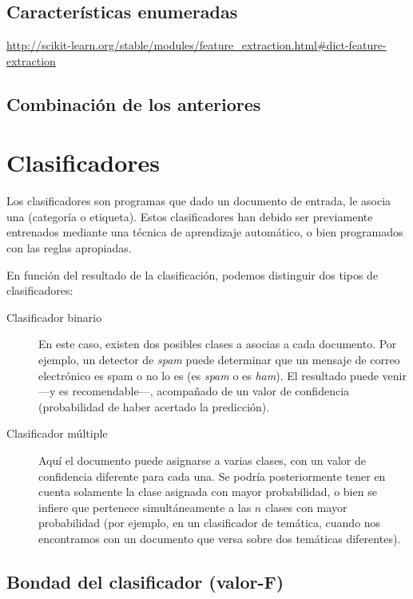 \citep{Socher2013}

\subsection{Características enumeradas}

\url{http://scikit-learn.org/stable/modules/feature_extraction.html#dict-feature-extraction}

\subsection{Combinación de los anteriores}


\section{Clasificadores}

Los clasificadores son programas que dado un documento de entrada, le asocia una  (categoría o etiqueta). Estos clasificadores han debido ser previamente entrenados mediante una técnica de aprendizaje automático, o bien programados con las reglas apropiadas.

En función del resultado de la clasificación, podemos distinguir dos tipos de clasificadores:
\nopagebreak
\begin{description}
\item[Clasificador binario] En este caso, existen dos posibles clases a asocias a cada documento. Por ejemplo, un detector de \emph{spam} puede determinar que un mensaje de correo electrónico es spam o no lo es (es \emph{spam} o es \emph{ham}). El resultado puede venir ---y es recomendable---, acompañado de un valor de confidencia (probabilidad de haber acertado la predicción).
\item[Clasificador múltiple] Aquí el documento puede asignarse a varias clases, con un valor de confidencia diferente para cada una. Se podría posteriormente tener en cuenta solamente la clase asignada con mayor probabilidad, o bien se infiere que pertenece simultáneamente a las $n$ clases con mayor probabilidad (por ejemplo, en un clasificador de temática, cuando nos encontramos con un documento que versa sobre dos temáticas diferentes).
\end{description}


\subsection{Bondad del clasificador (valor-F)}

